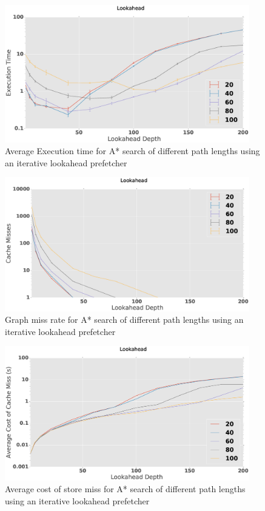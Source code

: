 \begin{figure}[htbp]
	\centering
	\includegraphics[width=0.95\textwidth]{figs/prefetch-itr.eps}
	\caption{Average Execution time for A* search of different path lengths using an iterative lookahead prefetcher}
	\label{fig:prefetch-lookahead}
\end{figure}
\begin{figure}[htbp]
	\centering
	\includegraphics[width=0.95\textwidth]{figs/prefetch-misses-itr.eps}
	\caption{Graph miss rate for A* search of different path lengths using an iterative lookahead prefetcher}
	\label{fig:prefetch-miss-lookahead}
\end{figure}
\begin{figure}[htbp]
	\centering
	\includegraphics[width=0.95\textwidth]{figs/prefetch-dbcost-itr.eps}
	\caption{Average cost of store miss for A* search of different path lengths using an iterative lookahead prefetcher}
	\label{fig:prefetch-dbcost-lookahead}
\end{figure}

